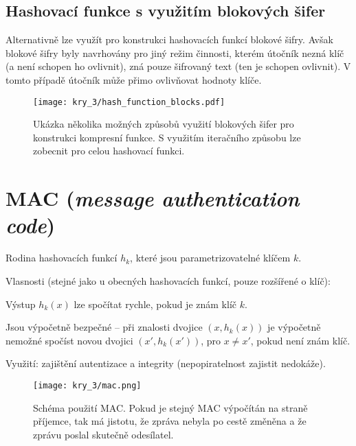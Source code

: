 \subsection*{Hashovací funkce s využitím blokových šifer}

Alternativně lze využít pro konstrukci hashovacích funkcí blokové šifry. Avšak blokové šifry byly navrhovány pro jiný režim činnosti, kterém útočník nezná klíč (a není schopen ho ovlivnit), zná pouze šifrovaný text (ten je schopen ovlivnit). V tomto případě útočník může přimo ovlivňovat hodnoty klíče.

\begin{figure}[H]
    \centering
    \texttt{[image: kry\_3/hash\_function\_blocks.pdf]}
    \caption{Ukázka několika možných způsobů využití blokových šifer pro konstrukci kompresní funkce. S využitím iteračního způsobu lze zobecnit pro celou hashovací funkci.}
\end{figure}


\section{MAC (\textit{message authentication code})}

\begin{compactitem}
    \item Rodina hashovacích funkcí $h_k$, které jsou parametrizovatelné klíčem $k$.
    \item Vlasnosti (stejné jako u obecných hashovacích funkcí, pouze rozšířené o klíč): \begin{compactitem}
        \item Výstup $h_k(x)$ lze spočítat rychle, pokud je znám klíč $k$.
        \item Jsou výpočetně bezpečné -- při znalosti dvojice $(x, h_k(x))$ je výpočetně nemožné spočíst novou dvojici $(x', h_k(x'))$, pro $x \neq x'$, pokud není znám klíč.
    \end{compactitem}
    \item Využití: zajištění autentizace a integrity (nepopiratelnost zajistit nedokáže).
\end{compactitem}

\begin{figure}[H]
    \centering
    \texttt{[image: kry\_3/mac.png]}
    \caption{Schéma použití MAC. Pokud je stejný MAC výpočítán na straně příjemce, tak má jistotu, že zpráva nebyla po cestě změněna a že zprávu poslal skutečně odesílatel.}
\end{figure}

